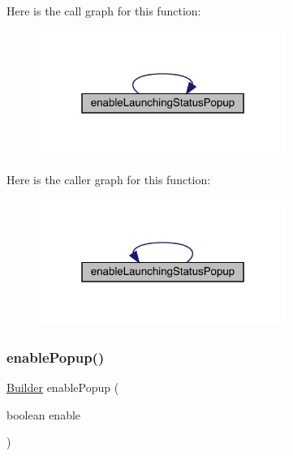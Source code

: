 Here is the call graph for this function\+:
\nopagebreak
\begin{figure}[H]
\begin{center}
\leavevmode
\includegraphics[width=229pt]{classcom_1_1toast_1_1android_1_1gamebase_1_1_gamebase_configuration_1_1_builder_a1012d5b14ba4676c15432cc45fd26488_cgraph}
\end{center}
\end{figure}
Here is the caller graph for this function\+:
\nopagebreak
\begin{figure}[H]
\begin{center}
\leavevmode
\includegraphics[width=229pt]{classcom_1_1toast_1_1android_1_1gamebase_1_1_gamebase_configuration_1_1_builder_a1012d5b14ba4676c15432cc45fd26488_icgraph}
\end{center}
\end{figure}
\mbox{\label{classcom_1_1toast_1_1android_1_1gamebase_1_1_gamebase_configuration_1_1_builder_a5b53589024bfbfc126c7f621ee0c2722}} 
\subsubsection{\texorpdfstring{enable\+Popup()}{enablePopup()}}
{\footnotesize\ttfamily \hyperlink{classcom_1_1toast_1_1android_1_1gamebase_1_1_gamebase_configuration_1_1_builder}{Builder} enable\+Popup (\begin{DoxyParamCaption}\item[{boolean}]{enable }\end{DoxyParamCaption})}

